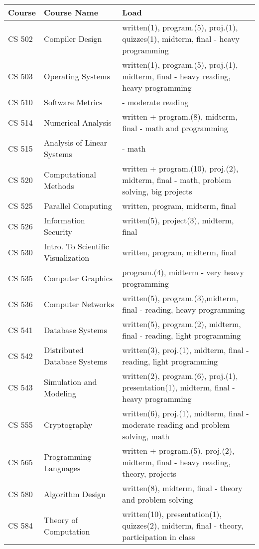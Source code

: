 \begin{table}[h]
	\centering
	\begin{tabular}{@{}lp{5cm}p{9cm}@{}}
		\toprule
		\textbf{Course} & \textbf{Course Name} & \textbf{Load} \\
		\midrule
		CS 502 & Compiler Design & written(1), program.(5), proj.(1), quizzes(1), midterm, final - heavy programming \\
		CS 503 & Operating Systems & written(1), program.(5), proj.(1), midterm, final - heavy reading, heavy programming \\
		CS 510 & Software Metrics & - moderate reading \\
		CS 514 & Numerical Analysis & written + program.(8), midterm, final - math and programming \\
		CS 515 & Analysis of Linear Systems & - math \\
		CS 520 & Computational Methods & written + program.(10), proj.(2), midterm, final - math, problem solving, big projects \\
		CS 525 & Parallel Computing & written, program, midterm, final \\
		CS 526 & Information Security & written(5), project(3), midterm, final \\
		CS 530 & Intro. To Scientific Visualization & written, program, midterm, final \\
		CS 535 & Computer Graphics & program.(4), midterm - very heavy programming \\
		CS 536 & Computer Networks & written(5), program.(3),midterm, final - reading, heavy programming \\
		CS 541 & Database Systems & written(5), program.(2), midterm, final - reading, light programming \\
		CS 542 & Distributed Database Systems & written(3), proj.(1), midterm, final - reading, light programming \\
		CS 543 & Simulation and Modeling & written(2), program.(6), proj.(1), presentation(1), midterm, final - heavy programming \\
		CS 555 & Cryptography & written(6), proj.(1), midterm, final - moderate reading and problem solving, math \\
		CS 565 & Programming Languages & written + program.(5), proj.(2), midterm, final - heavy reading, theory, projects \\
		CS 580 & Algorithm Design & written(8), midterm, final - theory and problem solving \\
		CS 584 & Theory of Computation & written(10), presentation(1), quizzes(2), midterm, final - theory, participation in class \\

\end{tabular}
\end{table}
